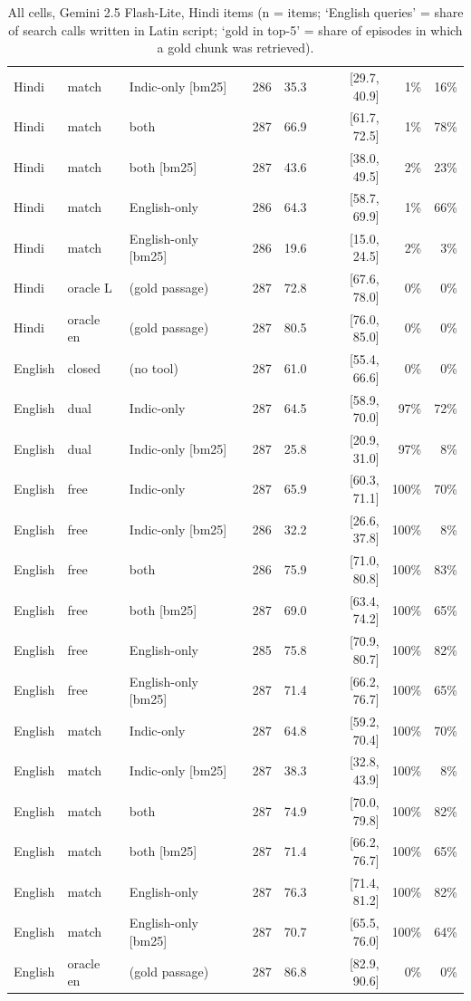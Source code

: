 \begin{table}[htbp]
\begin{tabular}{lllrrrrr}
Hindi & match & Indic-only [bm25] & 286 & 35.3 & [29.7, 40.9] & 1\% & 16\% \\
Hindi & match & both & 287 & 66.9 & [61.7, 72.5] & 1\% & 78\% \\
Hindi & match & both [bm25] & 287 & 43.6 & [38.0, 49.5] & 2\% & 23\% \\
Hindi & match & English-only & 286 & 64.3 & [58.7, 69.9] & 1\% & 66\% \\
Hindi & match & English-only [bm25] & 286 & 19.6 & [15.0, 24.5] & 2\% & 3\% \\
Hindi & oracle L & (gold passage) & 287 & 72.8 & [67.6, 78.0] & 0\% & 0\% \\
Hindi & oracle en & (gold passage) & 287 & 80.5 & [76.0, 85.0] & 0\% & 0\% \\
English & closed & (no tool) & 287 & 61.0 & [55.4, 66.6] & 0\% & 0\% \\
English & dual & Indic-only & 287 & 64.5 & [58.9, 70.0] & 97\% & 72\% \\
English & dual & Indic-only [bm25] & 287 & 25.8 & [20.9, 31.0] & 97\% & 8\% \\
English & free & Indic-only & 287 & 65.9 & [60.3, 71.1] & 100\% & 70\% \\
English & free & Indic-only [bm25] & 286 & 32.2 & [26.6, 37.8] & 100\% & 8\% \\
English & free & both & 286 & 75.9 & [71.0, 80.8] & 100\% & 83\% \\
English & free & both [bm25] & 287 & 69.0 & [63.4, 74.2] & 100\% & 65\% \\
English & free & English-only & 285 & 75.8 & [70.9, 80.7] & 100\% & 82\% \\
English & free & English-only [bm25] & 287 & 71.4 & [66.2, 76.7] & 100\% & 65\% \\
English & match & Indic-only & 287 & 64.8 & [59.2, 70.4] & 100\% & 70\% \\
English & match & Indic-only [bm25] & 287 & 38.3 & [32.8, 43.9] & 100\% & 8\% \\
English & match & both & 287 & 74.9 & [70.0, 79.8] & 100\% & 82\% \\
English & match & both [bm25] & 287 & 71.4 & [66.2, 76.7] & 100\% & 65\% \\
English & match & English-only & 287 & 76.3 & [71.4, 81.2] & 100\% & 82\% \\
English & match & English-only [bm25] & 287 & 70.7 & [65.5, 76.0] & 100\% & 64\% \\
English & oracle en & (gold passage) & 287 & 86.8 & [82.9, 90.6] & 0\% & 0\% \\
\bottomrule
\end{tabular}
\caption{All cells, Gemini 2.5 Flash-Lite, Hindi items (n = items; `English queries' = share of search calls written in Latin script; `gold in top-5' = share of episodes in which a gold chunk was retrieved).}
\end{table}

